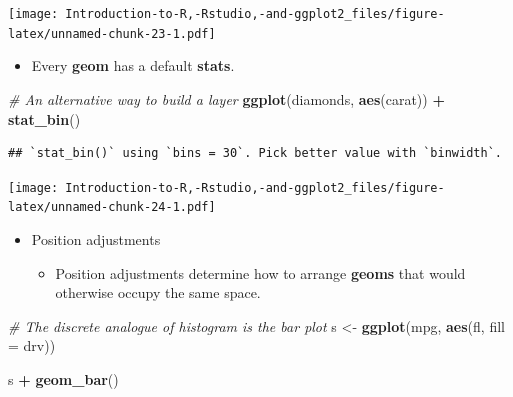 \documentclass[]{book}
\newenvironment{Shaded}{\begin{snugshade}}{\end{snugshade}}
\newcommand{\CommentTok}[1]{\textcolor[rgb]{0.56,0.35,0.01}{\textit{#1}}}
\newcommand{\DataTypeTok}[1]{\textcolor[rgb]{0.13,0.29,0.53}{#1}}
\newcommand{\KeywordTok}[1]{\textcolor[rgb]{0.13,0.29,0.53}{\textbf{#1}}}
\newcommand{\NormalTok}[1]{#1}
\newcommand{\OperatorTok}[1]{\textcolor[rgb]{0.81,0.36,0.00}{\textbf{#1}}}
\newcommand{\StringTok}[1]{\textcolor[rgb]{0.31,0.60,0.02}{#1}}
\providecommand{\tightlist}{%
  \setlength{\itemsep}{0pt}\setlength{\parskip}{0pt}}
\begin{document}
\texttt{[image: Introduction-to-R,-Rstudio,-and-ggplot2\_files/figure-latex/unnamed-chunk-23-1.pdf]}

\begin{itemize}
\tightlist
\item
  Every \textbf{geom} has a default \textbf{stats}.
\end{itemize}

\begin{Shaded}
\begin{Highlighting}[]
\CommentTok{# An alternative way to build a layer}
 \KeywordTok{ggplot}\NormalTok{(diamonds, }\KeywordTok{aes}\NormalTok{(carat)) }\OperatorTok{+}\StringTok{ }\KeywordTok{stat_bin}\NormalTok{()}
\end{Highlighting}
\end{Shaded}

\begin{verbatim}
## `stat_bin()` using `bins = 30`. Pick better value with `binwidth`.
\end{verbatim}

\texttt{[image: Introduction-to-R,-Rstudio,-and-ggplot2\_files/figure-latex/unnamed-chunk-24-1.pdf]}

\begin{itemize}
\tightlist
\item
  Position adjustments

  \begin{itemize}
  \tightlist
  \item
    Position adjustments determine how to arrange \textbf{geoms} that would otherwise occupy the same space.
  \end{itemize}
\end{itemize}

\begin{Shaded}
\begin{Highlighting}[]
\CommentTok{# The discrete analogue of histogram is the bar plot}
\NormalTok{s <-}\StringTok{ }\KeywordTok{ggplot}\NormalTok{(mpg, }\KeywordTok{aes}\NormalTok{(fl, }\DataTypeTok{fill =}\NormalTok{ drv))}
\end{Highlighting}
\end{Shaded}

\begin{Shaded}
\begin{Highlighting}[]
\NormalTok{s }\OperatorTok{+}\StringTok{ }\KeywordTok{geom_bar}\NormalTok{()}
\end{Highlighting}
\end{Shaded}
\end{document}
